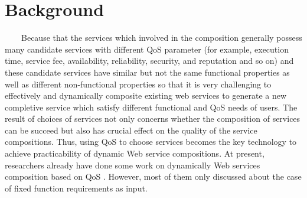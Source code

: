 \documentclass[senior,final,11pt]{iscs-thesis}
\begin{document}
\section{Background}
~~~~Because that the services which involved in the composition generally possess many candidate services with different QoS parameter (for example, execution time, service fee, availability, reliability, security, and reputation and so on\cite{3}) and these candidate services have similar but not the same functional properties as well as different non-functional properties so that it is very challenging to effectively and dynamically composite existing web services to generate a new completive service which satisfy different functional and QoS needs of users. The result of choices of services not only concerns whether the composition of services can be succeed but also has crucial effect on the quality of the service compositions.
Thus, using QoS to choose services becomes the key technology to achieve practicability of dynamic Web service compositions. At present, researchers already have done some work on dynamically Web services composition based on QoS \cite{4} \cite{5} \cite{6} \cite{7} \cite{8}. However, most of them only discussed about the case of fixed function requirements as input.
\end{document}
